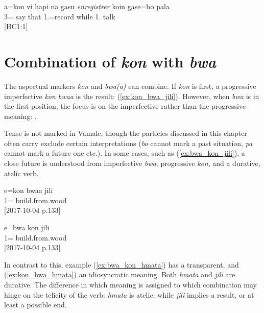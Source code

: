 \ea
\gll a=kon vi hapi na gasu \textit{enregistrer} koin gase=bo pala \\
 3= say that  1.=record while 1.  talk \\
\glt  {} {[HC1:1]}
\z
\pagebreak
\section{Combination of \textit{kon} with \textit{bwa}}
\label{sec:kon bwa}	

The aspectual markers \textit{kon}  and \textit{bwa(a)}  can combine. If \textit{kon} is first, a progressive imperfective \textit{kon bwaa} is the result:  (\ref{ex:kon_bwa_jili}). However, when \textit{bwa} is in the first position, the focus is on the imperfective rather than the progressive meaning: .%

Tense is not marked in Vamale, though the particles discussed in this chapter often carry exclude certain interpretations (\textit{bo}  cannot mark a past situation, \textit{pa}  cannot mark a future one etc.). In some cases, such as (\ref{ex:bwa_kon_jili}), a close future is understood from imperfective \textit{bwa}, progressive \textit{kon}, and a durative, atelic verb. %


\ea\label{ex:kon_bwa_jili} 
\gll e=kon bwaa jili\\
 1=  build.from.wood\\
\glt {} {[2017-10-04 p.133]}
\z 

\ea\label{ex:bwa_kon_jili} 
\gll e=bwa kon jili\\
 1=  build.from.wood\\
\glt {} {[2017-10-04 p.133]} 
\z

In contrast to this, example (\ref{ex:bwa_kon_hmata}) has a transparent, and (\ref{ex:kon_bwa_hmata}) an idiosyncratic meaning. Both \textit{hmata}  and \textit{jili}  are durative. The difference in which meaning is assigned to which combination may hinge on the telicity of the verb: \textit{hmata} is atelic, while \textit{jili} implies a result, or at least a possible end. 



